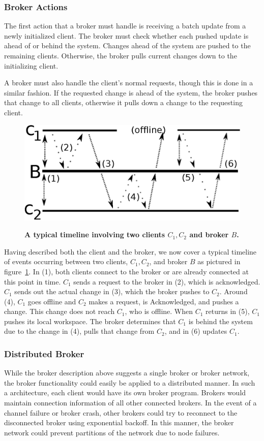 \subsubsection{Broker Actions}
The first action that a broker must handle is
receiving a batch update from a newly initialized client.
The broker must check whether each pushed update
is ahead of or behind the system.
Changes ahead of the system are pushed to the remaining clients.
Otherwise, the broker pulls current changes down to the initializing client.

A broker must also handle the client's normal requests,
though this is done in a similar fashion.
If the requested change is ahead of the system,
the broker pushes that change to all clients,
otherwise it pulls down a change to the requesting client.

\begin{figure}[h]
    \centering
    \includegraphics[scale=0.5]{figs/timeline.eps}
    \label{timeline}
    \caption{\textbf{A typical timeline involving two clients $C_1,C_2$ and broker $B$.}}
\end{figure}

Having described both the client and the broker,
we now cover a typical timeline of events
occurring between two clients, $C_1,C_2$, and broker $B$
as pictured in figure~\ref{timeline}.
In (1), both clients connect to the broker or are already connected
at this point in time. $C_1$ sends a request to the broker in (2),
which is acknowledged. $C_1$ sends out the actual change in (3),
which the broker pushes to $C_2$.
Around (4), $C_1$ goes offline and $C_2$ makes a request,
is Acknowledged, and pushes a change. This change
does not reach $C_1$, who is offline.
When $C_1$ returns in (5), $C_1$ pushes its local
workspace.  The broker determines that $C_1$ is behind
the system due to the change in (4), pulls that change
from $C_2$, and in (6) updates $C_1$.

\subsubsection{Distributed Broker}
\label{design.distributed}
While the broker description above suggests a single broker or broker network,
the broker functionality could easily be applied to a distributed manner.
In such a architecture, each client would have its own broker program.
Brokers would maintain connection information of all other connected brokers.
In the event of a channel failure or broker crash,
other brokers could try to reconnect to the disconnected broker
using exponential backoff.
In this manner, the broker network could prevent partitions of the network
due to node failures.

